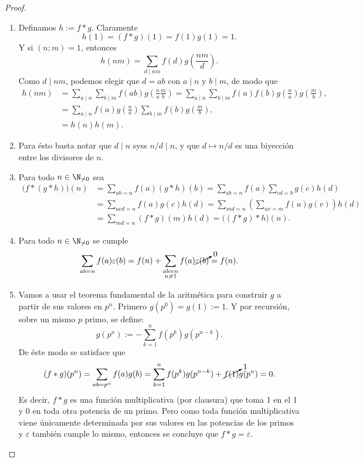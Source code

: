 \documentclass[teoria-numeros.tex]{subfiles}
\begin{document}
\begin{proof}
	\begin{enumerate}
		\item Definamos $h := f*g$.
			Claramente
			$$ h(1) = (f*g)(1) = f(1)g(1) = 1. $$
			Y si $(n; m) = 1$, entonces
			$$ h(nm) = \sum_{d \mid nm} f(d) g\left( \frac{nm}{d} \right). $$
			Como $d \mid nm$, podemos elegir que $d = ab$ con $a\mid n$ y $b\mid m$, de modo que
			\begin{align*}
				h(nm) &= \sum_{a\mid n} \sum_{b\mid m} f(ab) g\left( \frac{n}{a} \frac{m}{b} \right)
				= \sum_{a\mid n} \sum_{b\mid m} f(a)f(b) g\left( \frac{n}{a} \right) g\left( \frac{m}{b} \right), \\
				&= \sum_{a\mid n} f(a)g\left( \frac{n}{a} \right) \sum_{b\mid m} f(b)g\left( \frac{m}{b} \right), \\
				&= h(n)h(m).
			\end{align*}

		\item Para ésto basta notar que $d \mid n$ syss $n/d \mid n$, y que $d \mapsto n/d$ es una biyección entre los divisores de $n$.
		\item Para todo $n \in \N_{\ne 0}$ sea
			\begin{align*}
				\big( f*(g*h) \big)(n) &= \sum_{ab = n} f(a)(g*h)(b) = \sum_{ab = n} f(a) \sum_{cd = b} g(c)h(d) \\
				&= \sum_{acd = n} f(a)g(c)h(d) = \sum_{md = n} \left( \sum_{uv = m}f(u)g(v) \right) h(d) \\
				&= \sum_{md = n} (f*g)(m)h(d) = \big( (f*g)*h \big)(n).
			\end{align*}

		\item Para todo $n \in \N_{\ne 0}$ se cumple
			$$ \sum_{ab = n} f(a)\varepsilon(b) = f(n) + \sum_{\substack{ ab=n \\ n\ne 1 }} f(a)\cancelto{0}{ \varepsilon(b) } = f(n). $$

		\item Vamos a usar el teorema fundamental de la aritmética para construir $g$ a partir de sus valores en $p^n$.
			Primero $g(p^0) = g(1) := 1$.
			Y por recursión, sobre un mismo $p$ primo, se define:
			$$ g(p^n) := -\sum_{k=1}^n f(p^k)g(p^{n-k}). $$
			De éste modo se satisface que
			$$ (f*g)(p^n) = \sum_{ab = p^n}f(a)g(b) = \sum_{k=1}^n f(p^k)g(p^{n-k}) + \cancelto{1}{f(1)}g(p^n) = 0. $$
			Es decir, $f*g$ es una función multiplicativa (por clausura) que toma 1 en el 1 y 0 en toda otra potencia de un primo.
			Pero como toda función multiplicativa viene únicamente determinada por sus valores en las potencias de los primos
			y $\varepsilon$ también cumple lo mismo, entonces se concluye que $f*g = \varepsilon$. \qedhere
	\end{enumerate}
\end{proof}
\end{document}
